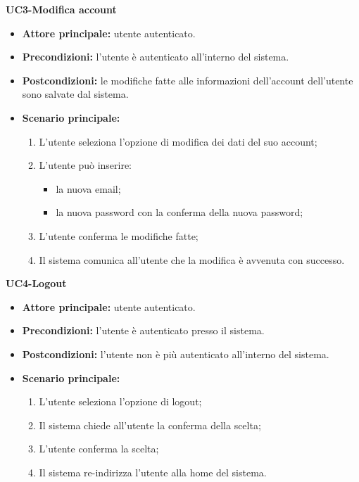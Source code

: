 
\textbf{UC3-Modifica account }
\begin{itemize}
    \item \textbf{Attore principale:} utente autenticato.
    \item \textbf{Precondizioni:} l'utente è autenticato all'interno del sistema.
    \item \textbf{Postcondizioni:} le modifiche fatte alle informazioni dell'account dell'utente sono
    salvate dal sistema.
    \item \textbf{Scenario principale:}
        \begin{enumerate}
            \item L'utente seleziona l'opzione di modifica dei dati del suo account;
            \item L'utente può inserire:
              \begin{itemize}
                \item la nuova email;
                \item la nuova password con la conferma della nuova password;
              \end{itemize}
            \item L'utente conferma le modifiche fatte;
            \item Il sistema comunica all'utente che la modifica è avvenuta con successo.
        \end{enumerate}
\end{itemize}

\textbf{UC4-Logout}
\begin{itemize}
    \item \textbf{Attore principale:} utente autenticato.
    \item \textbf{Precondizioni:} l'utente è autenticato presso il sistema.
    \item \textbf{Postcondizioni:} l'utente non è più autenticato all'interno del sistema.
    \item \textbf{Scenario principale:}
    \begin{enumerate}
        \item L'utente seleziona l'opzione di logout;
        \item Il sistema chiede all'utente la conferma della scelta;
        \item L'utente conferma la scelta;
        \item Il sistema re-indirizza l'utente alla home del sistema.
    \end{enumerate}
\end{itemize}

